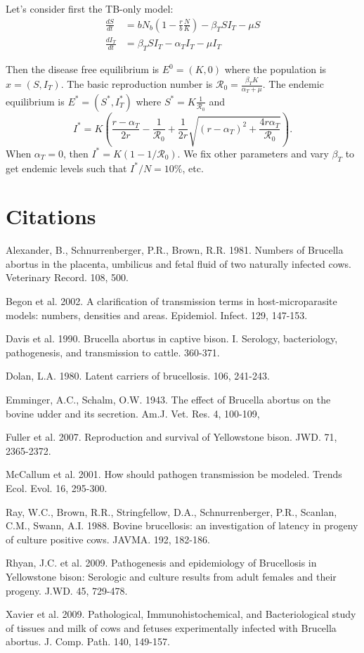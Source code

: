 \documentclass[letterpaper,12pt]{article}
\begin{document}
Let's consider first the TB-only model:
\begin{align}
\frac{dS}{dt}&=b N_b\left(1-\frac{r}{b}\frac{N}{K}\right) -\beta_T S I_T - \mu S\\
\frac{dI_T}{dt}&=\beta_T S I_T - \alpha_T I_T - \mu I_T
\end{align}

Then the disease free equilibrium is $E^0=(K,0)$ where the population is $x=(S,I_T)$. The basic reproduction number is $\mathcal{R}_0=\frac{\beta_T K}{\alpha_T + \mu}$. The endemic equilibrium is $E^*=(S^*,I_T^*)$ where $S^*=K\frac{1}{\mathcal{R}_0}$ and 
\begin{equation*}
I^*=K\left( \frac{r-\alpha_T}{2r}-\frac{1}{\mathcal{R}_0} + \frac{1}{2r}\sqrt{(r-\alpha_T)^2 + \frac{4r\alpha_T}{\mathcal{R}_0}}\right).
\end{equation*}
When $\alpha_T=0$, then $I^*=K(1-1/\mathcal{R}_0)$. We fix other parameters and vary $\beta_T$ to get endemic levels such that $I^*/N=10\%$, etc.
\pagebreak



\section*{Citations}
Alexander, B., Schnurrenberger, P.R., Brown, R.R. 1981. Numbers of Brucella abortus in the placenta, umbilicus and fetal fluid of two naturally infected cows. Veterinary Record. 108, 500. 

Begon et al. 2002. A clarification of transmission terms in host-microparasite models: numbers, densities and areas. Epidemiol. Infect. 129, 147-153.

Davis et al. 1990. Brucella abortus in captive bison. I. Serology, bacteriology, pathogenesis, and transmission to cattle. 360-371.

Dolan, L.A. 1980. Latent carriers of brucellosis. 106, 241-243. 

Emminger, A.C., Schalm, O.W. 1943. The effect of Brucella abortus on the bovine udder and its secretion. Am.J. Vet. Res. 4, 100-109, 

Fuller et al. 2007. Reproduction and survival of Yellowstone bison. JWD. 71, 2365-2372.

McCallum et al. 2001. How should pathogen transmission be modeled. Trends Ecol. Evol. 16, 295-300.

Ray, W.C., Brown, R.R., Stringfellow, D.A., Schnurrenberger, P.R., Scanlan, C.M., Swann, A.I. 1988. Bovine brucellosis: an investigation of latency in progeny of culture positive cows. JAVMA. 192, 182-186.

Rhyan, J.C. et al. 2009. Pathogenesis and epidemiology of Brucellosis in Yellowstone bison: Serologic and culture results from adult females and their progeny. J.WD. 45, 729-478.

Xavier et al. 2009. Pathological, Immunohistochemical, and Bacteriological study of tissues and milk of cows and fetuses experimentally infected with Brucella abortus. J. Comp. Path. 140, 149-157. 
\end{document}
